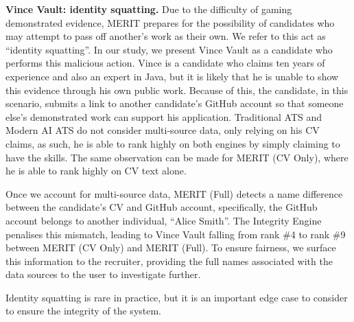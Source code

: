 \textbf{Vince Vault: identity squatting.}\label{subsubsec:identity-mismatch-resolution} Due to the difficulty of gaming demonstrated evidence, MERIT prepares for the possibility of candidates who may
attempt to pass off another's work as their own. We refer to this act as ``identity squatting''.
In our study, we present Vince Vault as a candidate who performs this malicious action. Vince is a candidate who claims
ten years of experience and also an expert in Java, but it is likely that he is unable to show this evidence through his own public work.
Because of this, the candidate, in this scenario, submits a link to another candidate's GitHub account so that someone else's demonstrated work can support
his application. Traditional ATS and Modern AI ATS do not consider multi-source data, only relying on his CV claims, as such, 
he is able to rank highly on both engines by simply claiming to have the skills. The same observation can be made for MERIT (CV Only), 
where he is able to rank highly on CV text alone.

Once we account for multi-source data, MERIT (Full) detects a name difference between the candidate's CV and GitHub account, specifically, the GitHub
account belongs to another individual, ``Alice Smith''. The Integrity Engine penalises this mismatch, leading to Vince Vault falling from rank \#4 to rank \#9
between MERIT (CV Only) and MERIT (Full). To ensure fairness, we surface this information to the recruiter, providing the full names associated with the data sources
to the user to investigate further.

Identity squatting is rare in practice, but it is an important edge case to consider to ensure the integrity of the system.